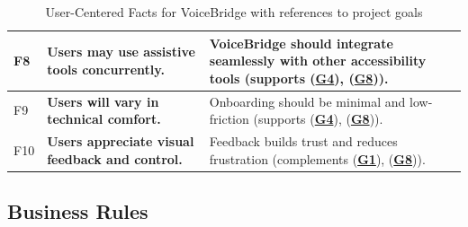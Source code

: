 \documentclass[12pt]{article}
\begin{document}
\begin{table}[H]
\begin{tabularx}{\textwidth}{p{1cm}p{6cm}X}
F8 & \textbf{Users may use assistive tools concurrently.} & VoiceBridge should integrate seamlessly with other accessibility tools (supports (\textbf{\hyperref[tab:project-goals]{G4}}), (\textbf{\hyperref[tab:project-goals]{G8}})). \\ \hline
F9 & \textbf{Users will vary in technical comfort.} & Onboarding should be minimal and low-friction (supports (\textbf{\hyperref[tab:project-goals]{G4}}), (\textbf{\hyperref[tab:project-goals]{G8}})). \\ \hline
F10 & \textbf{Users appreciate visual feedback and control.} & Feedback builds trust and reduces frustration (complements (\textbf{\hyperref[tab:project-goals]{G1}}), (\textbf{\hyperref[tab:project-goals]{G8}})). \\
\bottomrule
\end{tabularx}
\caption{User-Centered Facts for VoiceBridge with references to project goals}
\label{tab:user-facts}
\end{table}



\subsection{Business Rules}
\end{document}
